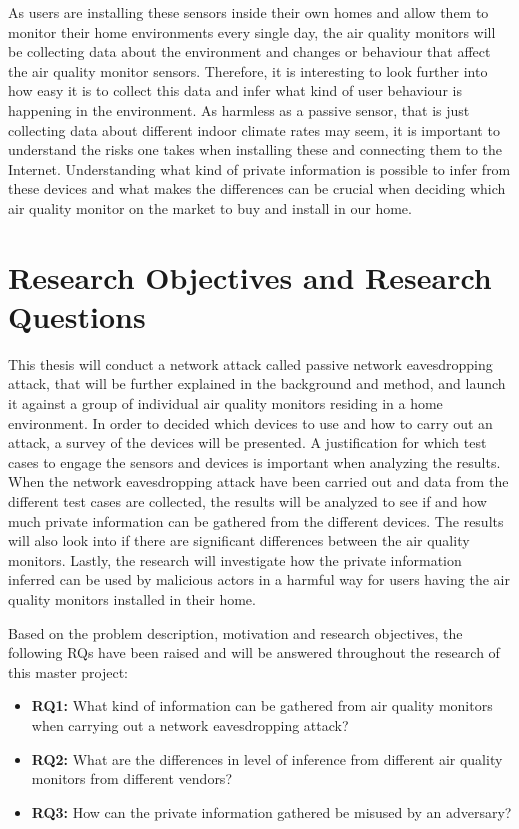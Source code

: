 As users are installing these sensors inside their own homes and allow them to monitor their home environments every single day, the air quality monitors will be collecting data about the environment and changes or behaviour that affect the air quality monitor sensors. Therefore, it is interesting to look further into how easy it is to collect this data and infer what kind of user behaviour is happening in the environment. As harmless as a passive sensor, that is just collecting data about different indoor climate rates may seem, it is important to understand the risks one takes when installing these and connecting them to the Internet. Understanding what kind of private information is possible to infer from these devices and what makes the differences can be crucial when deciding which air quality monitor on the market to buy and install in our home.

\section{Research Objectives and Research Questions}
This thesis will conduct a network attack called passive network eavesdropping attack, that will be further explained in the background and method, and launch it against a group of individual air quality monitors residing in a home environment. In order to decided which devices to use and how to carry out an attack, a survey of the devices will be presented. A justification for which test cases to engage the sensors and devices is important when analyzing the results. When the network eavesdropping attack have been carried out and data  from the different test cases are collected, the results will be analyzed to see if and how much private information can be gathered from the different devices. The results will also look into if there are significant differences between the air quality monitors. Lastly, the research will investigate how the private information inferred can be used by malicious actors in a harmful way for users having the air quality monitors installed in their home.

Based on the problem description, motivation and research objectives, the following \gls{RQ}s have been raised and will be answered throughout the research of this master project:
\begin{itemize}
    \item 
    \textbf{\gls{RQ}1:} What kind of information can be gathered from air quality monitors when carrying out a network eavesdropping attack?\\
    \item 
    \textbf{\gls{RQ2}:} What are the differences in level of inference from different air quality monitors from different vendors?\\
    \item 
    \textbf{\gls{RQ3}:} How can the private information gathered be misused by an adversary?\\
\end{itemize}


